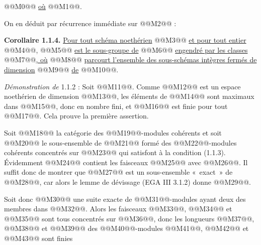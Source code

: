
@@M0@@
\uline{où} @@M1@@.

On en déduit par récurrence immédiate sur @@M2@@ :

\textbf{Corollaire 1.1.4.} \uline{Pour tout schéma noethérien} @@M3@@ \uline{et pour tout entier} @@M4@@, @@M5@@ \uline{est le sous-groupe de} @@M6@@ \uline{engendré par les classes} @@M7@@\uline{, où} @@M8@@ \uline{parcourt l'ensemble des sous-schémas intègres fermés de dimension} @@M9@@ \uline{de} @@M10@@.

\emph{Démonstration de} 1.1.2 : Soit @@M11@@. Comme @@M12@@ est un espace noethérien de dimension @@M13@@, les éléments de @@M14@@ sont maximaux dans @@M15@@, donc en nombre fini, et @@M16@@ est finie pour tout @@M17@@. Cela prouve la première assertion.

Soit @@M18@@ la catégorie des @@M19@@-modules cohérents et soit @@M20@@ le sous-ensemble de @@M21@@ formé des @@M22@@-modules cohérents concentrés sur @@M23@@ qui satisfont à la condition (1.1.3). Évidemment @@M24@@ contient les faisceaux @@M25@@ avec @@M26@@. Il suffit donc de montrer que @@M27@@ est un sous-ensemble «~exact~» de @@M28@@, car alors le lemme de dévissage (EGA III 3.1.2) donne @@M29@@.

Soit donc
@@M30@@
une suite exacte de @@M31@@-modules ayant deux des membres dans @@M32@@. Alors les faisceaux @@M33@@, @@M34@@ et @@M35@@ sont tous concentrés sur @@M36@@, donc les longueurs @@M37@@, @@M38@@ et @@M39@@ des @@M40@@-modules @@M41@@, @@M42@@ et @@M43@@ sont finies
